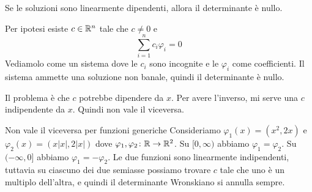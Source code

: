 \documentclass[a4paper]{article}
\begin{document}
\begin{radioactive}
\begin{snippetproposition}{}
    Se le soluzioni sono linearmente dipendenti,
    allora il determinante è nullo.
\end{snippetproposition}
\end{radioactive}

\begin{radioactive}
\begin{snippetproof}{}
    Per ipotesi esiste \(c \in \mathbb{R}^n\) tale che \(c \neq 0\) e
    \[
        \sum_{i=1}^n c_i \varphi_i = 0
    \]
    Vediamolo come un sistema dove le \(c_i\) sono incognite e le \(\varphi_i\) come coefficienti. Il sistema ammette una soluzione non banale, quindi il determinante è nullo.
\end{snippetproof}
\end{radioactive}

\begin{radioactive}
Il problema è che \(c\) potrebbe dipendere da \(x\). Per avere l'inverso,
mi serve una \(c\) indipendente da \(x\). Quindi non vale il viceversa.
\end{radioactive}

\begin{radioactive}
\begin{snippetexample}{Non vale il viceversa per funzioni generiche}
    Consideriamo \(\varphi_1(x) = (x^2, 2x)\) e \(\varphi_2(x) = (x|x|, 2|x|)\)
    dove \(\varphi_1, \varphi_2 \colon \mathbb{R} \to \mathbb{R}^2\).
    Su \([0,\infty)\) abbiamo \(\varphi_1 = \varphi_2\).
    Su \((-\infty,0]\) abbiamo \(\varphi_1 = - \varphi_2\).
    Le due funzioni sono linearmente indipendenti, tuttavia su ciascuno dei due semiasse
    possiamo trovare \(c\) tale che uno è un multiplo dell'altra, e quindi il determinante
    Wronskiano si annulla sempre.
\end{snippetexample}
\end{radioactive}
\end{document}
